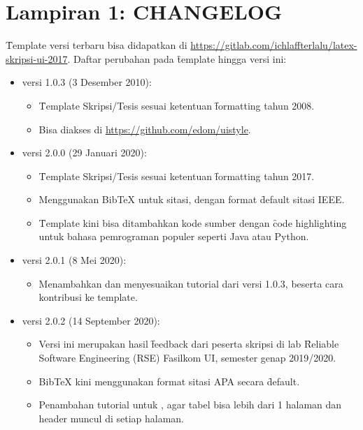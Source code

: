 \chapter*{Lampiran 1: CHANGELOG}
\label{appendix:changelog}

\f{Template} versi terbaru bisa didapatkan di \url{https://gitlab.com/ichlaffterlalu/latex-skripsi-ui-2017}. Daftar perubahan pada \f{template} hingga versi ini:
\begin{itemize}
	\item versi 1.0.3 (3 Desember 2010):
		\begin{itemize}
			\item \f{Template} Skripsi/Tesis sesuai ketentuan \f{formatting} tahun 2008.
			\item Bisa diakses di \url{https://github.com/edom/uistyle}.
		\end{itemize}
	\item versi 2.0.0 (29 Januari 2020):
		\begin{itemize}
			\item \f{Template} Skripsi/Tesis sesuai ketentuan \f{formatting} tahun 2017.
			\item Menggunakan BibTeX untuk sitasi, dengan format \f{default} sitasi IEEE.
			\item \f{Template} kini bisa ditambahkan kode sumber dengan \f{code highlighting} untuk bahasa pemrograman populer seperti Java atau Python.
		\end{itemize}
	\item versi 2.0.1 (8 Mei 2020):
		\begin{itemize}
			\item Menambahkan dan menyesuaikan tutorial dari versi 1.0.3, beserta cara kontribusi ke template.
		\end{itemize}
	\item versi 2.0.2 (14 September 2020):
		\begin{itemize}
			\item Versi ini merupakan hasil \f{feedback} dari peserta skripsi di lab \f{Reliable Software Engineering} (RSE) Fasilkom UI, semester genap 2019/2020.
			\item BibTeX kini menggunakan format sitasi APA secara \f{default}.
			\item Penambahan tutorial untuk , agar tabel bisa lebih dari 1 halaman dan header muncul di setiap halaman.

\end{itemize}
\end{itemize}
